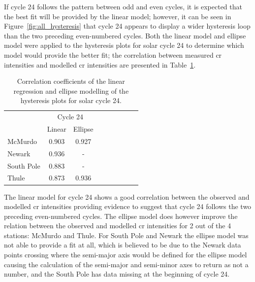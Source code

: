 If cycle 24 follows the pattern between odd and even cycles, it is expected that the best fit will be provided by the linear model; however, it can be seen in Figure~\ref{fig:all_hysteresis} that cycle 24 appears to display a wider hysteresis loop than the two preceding even-numbered cycles. Both the linear model and ellipse model were applied to the hysteresis plots for solar cycle 24 to determine which model would provide the better fit; the correlation between measured \gls{cr} intensities and modelled \gls{cr} intensities are presented in Table~\ref{table:hysteresis_24}.

\begin{table}[!ht]
	\begin{center}
	\caption{Correlation coefficients of the linear regression and ellipse modelling of the hysteresis plots for solar cycle 24.}
	\label{table:hysteresis_24}
	\begin{tabular}{l c c c c c c c c}
		\hline 
		{} & \multicolumn{2}{c}{Cycle 24} \\
		{} & {Linear} & {Ellipse} \\ \hline
		{McMurdo} & {0.903} & {0.927} \\
		{Newark} & {0.936} & {-} \\
		{South Pole} & {0.883} & {-} \\
		{Thule} & {0.873} & {0.936} \\ \hline
	\end{tabular}
	\end{center}
\end{table}

The linear model for cycle 24 shows a good correlation between the observed and modelled \gls{cr} intensities providing evidence to suggest that cycle 24 follows the two preceding even-numbered cycles. The ellipse model does however improve the relation between the observed and modelled \gls{cr} intensities for 2 out of the 4 stations: McMurdo and Thule. For South Pole and Newark the ellipse model was not able to provide a fit at all, which is believed to be due to the Newark data points crossing where the semi-major axis would be defined for the ellipse model causing the calculation of the semi-major and semi-minor axes to return as not a number, and the South Pole has data missing at the beginning of cycle 24.

